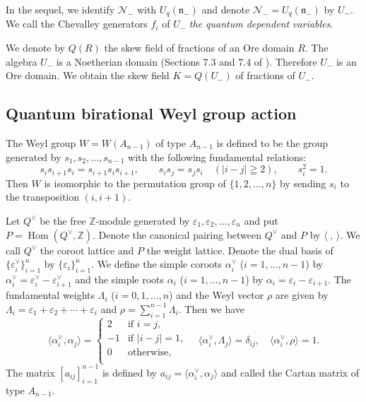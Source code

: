 \documentclass[12pt,twoside]{article}
\newcommand\N{{\mathcal N}}
\newcommand\n{{\mathfrak n}}
\newcommand\bra{\langle}
\newcommand\ket{\rangle}
\newcommand\Hom{\mathop{\mathrm{Hom}}\nolimits}
\newcommand\av{\alpha^\vee}
\newcommand\eps{\varepsilon}
\newcommand\epsv{\eps^\vee}
\newcommand\Qv{Q^\vee}
\newcommand\Z{{\mathbb Z}} %
\theoremstyle{plain} %
\theoremstyle{definition} %
\theoremstyle{definition} %
\numberwithin{theorem}{section}
\numberwithin{equation}{section}
\numberwithin{figure}{section}
\numberwithin{table}{section}
\begin{document}
In the sequel, we identify $\N_-$ with $U_q(\n_-)$
and denote $\N_-=U_q(\n_-)$ by $U_-$. 
We call the Chevalley generators $f_i$ of $U_-$ 
{\em the quantum dependent variables}.

We denote by $Q(R)$ the skew field of fractions of an Ore domain $R$.
The algebra $U_-$ is a Noetherian domain 
(Sections 7.3 and 7.4 of \cite{Jos-1995}).
Therefore $U_-$ is an Ore domain.
We obtain the skew field $K=Q(U_-)$ of fractions of $U_-$. 


\subsection{Quantum birational Weyl group action}
\label{sec:Weyl-A_{n-1}}

The Weyl group $W=W(A_{n-1})$ of type $A_{n-1}$ is defined to be the group
generated by $s_1,s_2,\ldots,s_{n-1}$ with the following fundamental relations:
\begin{equation*}
 s_i s_{i+1}s_i = s_{i+1}s_i s_{i+1}, \qquad
 s_i s_j = s_j s_i \quad (|i-j|\geqq 2), \qquad
 s_i^2 = 1.
\end{equation*}
Then $W$ is isomorphic to the permutation group of $\{1,2,\ldots,n\}$ 
by sending $s_i$ to the transposition $(i,i+1)$.

Let $\Qv$ be the free $\Z$-module generated by $\eps_1,\eps_2,\ldots,\eps_n$
and put $P=\Hom(\Qv,\Z)$.
Denote the canonical pairing between $\Qv$ and $P$ by $\bra\ ,\ \ket$.
We call $\Qv$ the coroot lattice and $P$ the weight lattice.
Denote the dual basis of $\{\epsv_i\}_{i=1}^n$ by $\{\eps_i\}_{i=1}^n$.
We define the simple coroots $\av_i$ ($i=1,\ldots,n-1$) by $\av_i=\epsv_i-\epsv_{i+1}$
and the simple roots $\alpha_i$ ($i=1,\ldots,n-1$) by $\alpha_i=\eps_i-\eps_{i+1}$.
The fundamental weights $\Lambda_i$ ($i=0,1,\ldots,n$) 
and the Weyl vector $\rho$ are given by
$\Lambda_i = \eps_1+\eps_2+\cdots+\eps_i$ and $\rho=\sum_{i=1}^{n-1}\Lambda_i$.
Then we have
\begin{equation*}
 \bra\av_i,\alpha_j\ket =
 \begin{cases}
   2 & \text{if $i=j$},  \\
  -1 & \text{if $|i-j|=1$}, \\
   0 & \text{otherwise}, \\ 
 \end{cases}
 \quad
 \bra\av_i,\Lambda_j\ket = \delta_{ij},
 \quad
 \bra\av_i,\rho\ket = 1.
\end{equation*}
The matrix $[a_{ij}]_{i=1}^{n-1}$ is defined by $a_{ij}=\bra\av_i,\alpha_j\ket$ and
called the Cartan matrix of type $A_{n-1}$.
\end{document}
